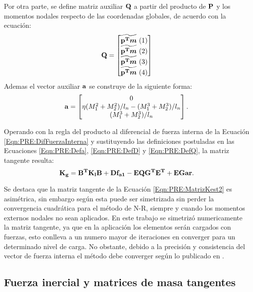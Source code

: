  Por otra parte, se define matriz auxiliar $\bf{Q}$  a partir del producto de $\bf{P}$ y los momentos nodales respecto de las coordenadas globales, de acuerdo con la ecuación:
 \begin{equation}
 	\label{Eqn:PRE:DefQ}
 	\bf{Q}=\begin{bmatrix}
 		\widetilde{\bf{p}^T\boldsymbol{m}} ~(1)\\
 		\widetilde{\bf{p}^T\boldsymbol{m}} ~(2)\\
 		\widetilde{\bf{p}^T\boldsymbol{m}} ~(3)\\
 		\widetilde{\bf{p}^T\boldsymbol{m}} ~(4)
 	\end{bmatrix}
 \end{equation}
Ademas el vector auxiliar $\bf{a}$ se construye de la siguiente forma:
\begin{equation}
	\label{Eqn:PRE:Defa}
\bf{a} =\begin{bmatrix}
	0\\
	\eta(M_1^2+M_2^2)/l_n-(M_1^3+M_2^3)/l_n\\
	(M_1^3+M_2^3)/l_n
\end{bmatrix}.
\end{equation}



Operando con la regla del producto al diferencial de fuerza interna de la Ecuación  \eqref{Eqn:PRE:DifFuerzaInterna} y sustituyendo las definiciones postuladas en las Ecuaciones \eqref{Eqn:PRE:Defa}, \eqref{Eqn:PRE:DefD} y \eqref{Eqn:PRE:DefQ}, la matriz tangente resulta:
\begin{equation} 
	\label{Eqn:PRE:MatrizKest2}
	\bf{K_g}=\bf{B}^T\bf{K_l}\bf{B}+\bf{D} f_{a1}-\bf{E}\bf{Q}\bf{G^T}\bf{E^T} +\bf{EGar}.
\end{equation}

Se destaca que la matriz tangente de la Ecuación  \eqref{Eqn:PRE:MatrizKest2} es asimétrica, sin embargo según \cite{Nour-Omid1991} esta puede ser simetrizada sin perder la convergencia cuadrática
para el método de  \gls{N-R}, siempre y cuando los momentos externos nodales no sean aplicados. En este trabajo se simetrizó numericamente la matriz tangente, ya que en la aplicación los elementos serán cargados con fuerzas, esto conlleva a un numero mayor de iteraciones en converger para un determinado nivel de carga. No obstante, debido a la precisión y consistencia del vector de fuerza interna el método debe converger según lo publicado en \citep{rankin1988use}.

\subsection{Fuerza inercial y matrices de masa tangentes}\label{Sec:PRE:Inercial}

